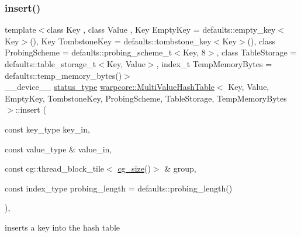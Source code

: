 \subsubsection{\texorpdfstring{insert()}{insert()}\hspace{0.1cm}{\footnotesize\ttfamily [1/2]}}
{\footnotesize\ttfamily template$<$class Key , class Value , Key Empty\+Key = defaults\+::empty\+\_\+key$<$\+Key$>$(), Key Tombstone\+Key = defaults\+::tombstone\+\_\+key$<$\+Key$>$(), class Probing\+Scheme  = defaults\+::probing\+\_\+scheme\+\_\+t$<$\+Key, 8$>$, class Table\+Storage  = defaults\+::table\+\_\+storage\+\_\+t$<$\+Key, Value$>$, index\+\_\+t Temp\+Memory\+Bytes = defaults\+::temp\+\_\+memory\+\_\+bytes()$>$ \\
\+\_\+\+\_\+device\+\_\+\+\_\+ \hyperlink{classwarpcore_1_1Status}{status\+\_\+type} \hyperlink{classwarpcore_1_1MultiValueHashTable}{warpcore\+::\+Multi\+Value\+Hash\+Table}$<$ Key, Value, Empty\+Key, Tombstone\+Key, Probing\+Scheme, Table\+Storage, Temp\+Memory\+Bytes $>$\+::insert (\begin{DoxyParamCaption}\item[{const key\+\_\+type}]{key\+\_\+in,  }\item[{const value\+\_\+type \&}]{value\+\_\+in,  }\item[{const cg\+::thread\+\_\+block\+\_\+tile$<$ \hyperlink{classwarpcore_1_1MultiValueHashTable_ad300c5a01bd933343ff08176fb4b4e29}{cg\+\_\+size}()$>$ \&}]{group,  }\item[{const index\+\_\+type}]{probing\+\_\+length = {\ttfamily defaults\+:\+:probing\+\_\+length()} }\end{DoxyParamCaption})\hspace{0.3cm}{\ttfamily [inline]}, {\ttfamily [noexcept]}}



inserts a key into the hash table 


